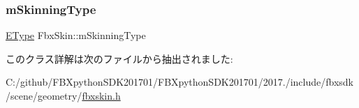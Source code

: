 \subsubsection{\texorpdfstring{m\+Skinning\+Type}{mSkinningType}}
{\footnotesize\ttfamily \hyperlink{class_fbx_skin_aee398789ebed22fa97269a26c6049a16}{E\+Type} Fbx\+Skin\+::m\+Skinning\+Type\hspace{0.3cm}{\ttfamily [protected]}}



このクラス詳解は次のファイルから抽出されました\+:\begin{DoxyCompactItemize}
\item 
C\+:/github/\+F\+B\+Xpython\+S\+D\+K201701/\+F\+B\+Xpython\+S\+D\+K201701/2017./include/fbxsdk/scene/geometry/\hyperlink{fbxskin_8h}{fbxskin.\+h}\end{DoxyCompactItemize}
